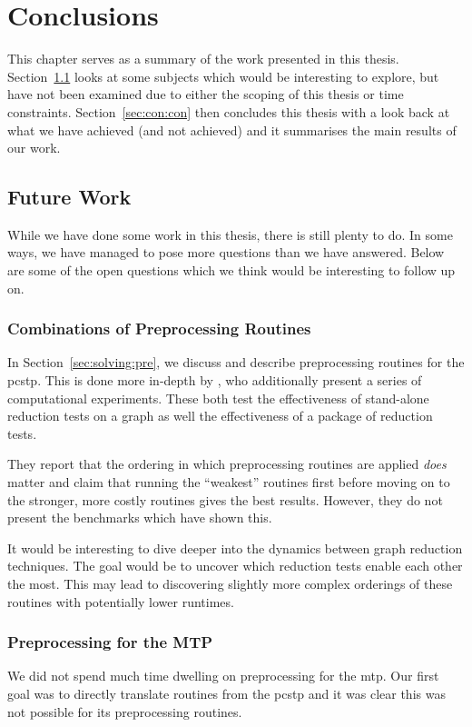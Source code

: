 
\chapter{Conclusions}
This chapter serves as a summary of the work presented in this thesis.
Section~\ref{sec:con:fut} looks at some subjects which would be
interesting to explore, but have not been examined
due to either the scoping of this thesis or
time constraints.
Section~\ref{sec:con:con} then concludes this thesis with a look back at what we
have achieved (and not achieved) and it summarises the main results of our work.

\section{Future Work}\label{sec:con:fut}
While we have done some work in this thesis, there is still plenty to do. In some ways,
we have managed to pose more questions than we have answered. Below are some of the open
questions which we think would be interesting to follow up on.

\subsection{Combinations of Preprocessing Routines}
In Section~\ref{sec:solving:pre}, we discuss and describe preprocessing routines for
the \gls{pcstp}. This is done more in-depth by \citet{rehfeldt2016reduction}, who
additionally present a series of computational experiments. These both test
the effectiveness of stand-alone reduction tests on a graph
as well the effectiveness of a package of reduction tests.

They report that the ordering
in which preprocessing routines are applied \textit{does} matter and claim that running
the ``weakest'' routines first before moving on to the stronger, more costly routines
gives the best results.
However, they do not present the benchmarks which have shown this.

It would be interesting to dive deeper into the dynamics between graph reduction
techniques. The goal would be to uncover which reduction tests
enable each other the most. This may lead to discovering slightly more
complex orderings of these routines with potentially lower runtimes.

\subsection{Preprocessing for the MTP}
We did not spend much time dwelling on preprocessing for the \gls{mtp}. Our first goal was
to directly translate routines from the \gls{pcstp} and it was clear this was not possible
for its preprocessing routines.

